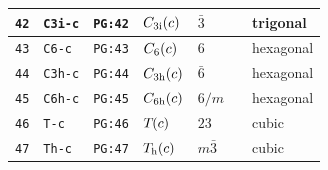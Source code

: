 \documentclass[fleqn,10pt]{jsarticle}
\begin{document}
\begin{center}
\begin{longtable}{lllllll}
\texttt{42} & \texttt{C3i-c} & \texttt{PG:42} & $C_{\rm 3i}(c)$ & $\bar{3}$ &  & trigonal \\ \hline
\texttt{43} & \texttt{C6-c} & \texttt{PG:43} & $C_{\rm 6}(c)$ & $6$ &  & hexagonal \\
\texttt{44} & \texttt{C3h-c} & \texttt{PG:44} & $C_{\rm 3h}(c)$ & $\bar{6}$ &  & hexagonal \\
\texttt{45} & \texttt{C6h-c} & \texttt{PG:45} & $C_{\rm 6h}(c)$ & $6/m$ &  & hexagonal \\ \hline
\texttt{46} & \texttt{T-c} & \texttt{PG:46} & $T_{\rm }(c)$ & $23$ &  & cubic \\
\texttt{47} & \texttt{Th-c} & \texttt{PG:47} & $T_{\rm h}(c)$ & $m\bar{3}$ &  & cubic \\
\end{longtable}
\end{center}
\end{document}
